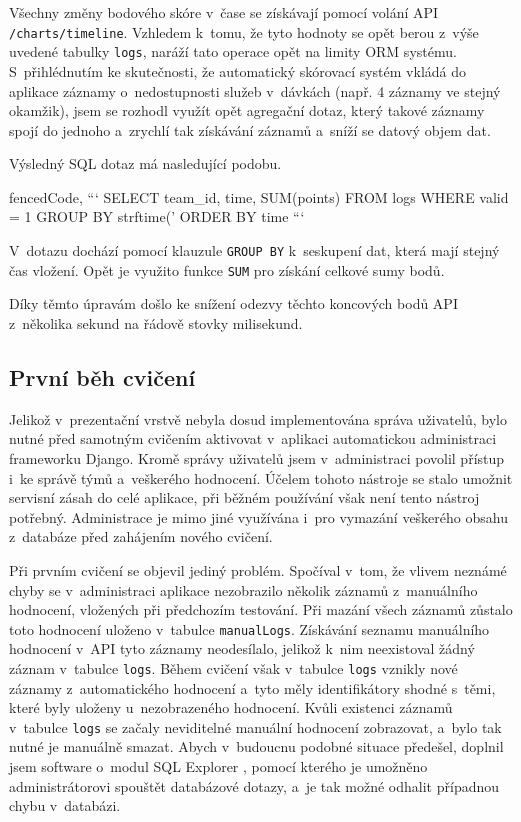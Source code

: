 \documentclass[
  digital,
  twoside,
  table, 
  nolof, 
  nolot
]{fithesis3}
\begin{document}
Všechny změny bodového skóre v~čase se získávají pomocí volání API \texttt{/charts/timeline}. Vzhledem k~tomu, že tyto hodnoty se opět berou z~výše uvedené tabulky \texttt{logs}, naráží tato operace opět na limity ORM systému. S~přihlédnutím ke skutečnosti, že automatický skórovací systém vkládá do aplikace záznamy o~nedostupnosti služeb v~dávkách (např. 4 záznamy ve stejný okamžik), jsem se rozhodl využít opět agregační dotaz, který takové záznamy spojí do jednoho a~zrychlí tak získávání záznamů a~sníží se datový objem dat.

\noindent
Výsledný SQL dotaz má nasledující podobu.

\begin{markdown*}{%
  fencedCode,
}
```
SELECT team_id, time, SUM(points) FROM logs 
WHERE valid = 1 
GROUP BY strftime('%
ORDER BY time
```
\end{markdown*}

V~dotazu dochází pomocí klauzule \texttt{GROUP\ BY} k~seskupení dat, která mají stejný čas vložení. Opět je využito funkce \texttt{SUM} pro získání celkové sumy bodů.

Díky těmto úpravám došlo ke snížení odezvy těchto koncových bodů API z~několika sekund na řádově stovky milisekund. 

\subsection{První běh cvičení}

Jelikož v~prezentační vrstvě nebyla dosud implementována správa uživatelů, bylo nutné před samotným cvičením aktivovat v~aplikaci automatickou administraci frameworku Django. Kromě správy uživatelů jsem v~administraci povolil přístup i~ke správě týmů a~veškerého hodnocení. Účelem tohoto nástroje se stalo umožnit servisní zásah do celé aplikace, při běžném používání však není tento nástroj potřebný. Administrace je mimo jiné využívána i~pro vymazání veškerého obsahu z~databáze před zahájením nového cvičení.

Při prvním cvičení se objevil jediný problém. Spočíval v~tom, že vlivem neznámé chyby se v~administraci aplikace nezobrazilo několik záznamů z~manuálního hodnocení, vložených při předchozím testování. Při mazání všech záznamů zůstalo toto hodnocení uloženo v~tabulce \texttt{manualLogs}. Získávání seznamu manuálního hodnocení v~API tyto záznamy neodesílalo, jelikož k~nim neexistoval žádný záznam v~tabulce \texttt{logs}. Během cvičení však v~tabulce \texttt{logs} vznikly nové záznamy z~automatického hodnocení a~tyto měly identifikátory shodné s~těmi, které byly uloženy u~nezobrazeného hodnocení. Kvůli existenci záznamů v~tabulce \texttt{logs} se začaly neviditelné manuální hodnocení zobrazovat, a~bylo tak nutné je manuálně smazat. Abych v~budoucnu podobné situace předešel, doplnil jsem software o~modul SQL Explorer \cite{sqlexplorer}, pomocí kterého je umožněno administrátorovi spouštět databázové dotazy, a~je tak možné odhalit případnou chybu v~databázi.
\end{document}

